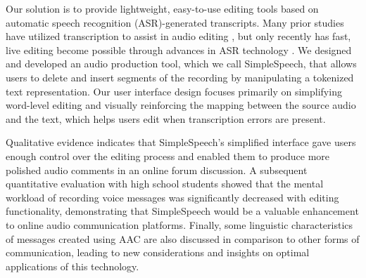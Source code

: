 Our solution is to provide lightweight, easy-to-use editing tools based on automatic speech recognition (ASR)-generated transcripts.
Many prior studies have utilized transcription to assist in audio editing \cite{casares,rubin,whittaker_semantic}, but only recently has fast, live editing become possible through advances in ASR technology \cite{baker,saon}.
We designed and developed an audio production tool, which we call SimpleSpeech, that allows users to delete and insert segments of the recording by manipulating a tokenized text representation. 
Our user interface design focuses primarily on simplifying word-level editing and visually reinforcing the mapping between the source audio and the text, which helps users edit when transcription errors are present.


Qualitative evidence indicates that SimpleSpeech's simplified interface gave users enough control over the editing process and enabled them to produce more polished audio comments in an online forum discussion.
A subsequent quantitative evaluation with high school students showed that the mental workload of recording voice messages was significantly decreased with editing functionality, demonstrating that SimpleSpeech would be a valuable enhancement to online audio communication platforms.
Finally, some linguistic characteristics of messages created using AAC are also discussed in comparison to other forms of communication, leading to new considerations and insights on optimal applications of this technology.